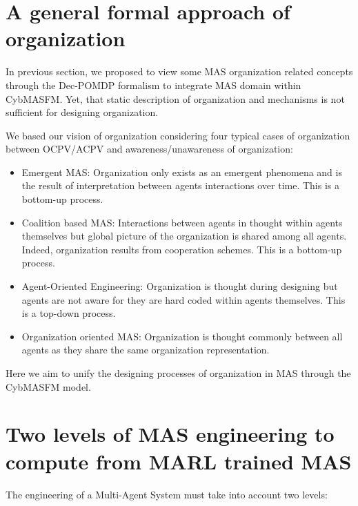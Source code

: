 \documentclass[conference]{IEEEtran}
\begin{document}
\section{A general formal approach of organization}

In previous section, we proposed to view some MAS organization related concepts through the Dec-POMDP formalism to integrate MAS domain within CybMASFM. Yet, that static description of organization and mechanisms is not sufficient for designing organization.

We based our vision of organization considering four typical cases of organization between OCPV/ACPV and awareness/unawareness of organization\cite{Picard2009}:

\begin{itemize}
    \item Emergent MAS: Organization only exists as an emergent phenomena and is the result of interpretation between agents interactions over time. This is a bottom-up process.
    \item Coalition based MAS: Interactions between agents in thought within agents themselves but global picture of the organization is shared among all agents. Indeed, organization results from cooperation schemes. This is a bottom-up process.
    \item Agent-Oriented Engineering: Organization is thought during designing but agents are not aware for they are hard coded within agents themselves. This is a top-down process.
    \item Organization oriented MAS: Organization is thought commonly between all agents as they share the same organization representation.
\end{itemize}

Here we aim to unify the designing processes of organization in MAS through the CybMASFM model.

\section{Two levels of MAS engineering to compute from MARL trained MAS}

The engineering of a Multi-Agent System must take into account two levels:
\end{document}
